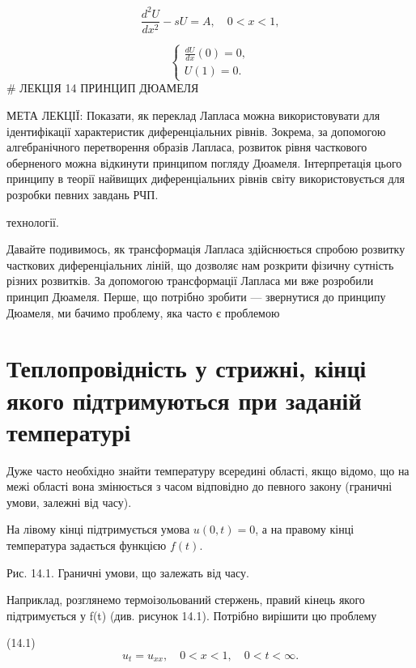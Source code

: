 \documentclass[
  ukrainian,
]{article}
\begin{document}
\[
\frac{d^2U}{dx^2} - sU = A, \quad 0 < x < 1,
\]

\[
\begin{cases}
\frac{dU}{dx}(0) = 0, \\
U(1) = 0.
\end{cases}
\] \# ЛЕКЦІЯ 14 ПРИНЦИП ДЮАМЕЛЯ

МЕТА ЛЕКЦІЇ: Показати, як переклад Лапласа можна використовувати для
ідентифікації характеристик диференціальних рівнів. Зокрема, за
допомогою алгебранічного перетворення образів Лапласа, розвиток рівня
часткового оберненого можна відкинути принципом погляду Дюамеля.
Інтерпретація цього принципу в теорії найвищих диференціальних рівнів
світу використовується для розробки певних завдань РЧП.

технології.

Давайте подивимось, як трансформація Лапласа здійснюється спробою
розвитку часткових диференціальних ліній, що дозволяє нам розкрити
фізичну сутність різних розвитків. За допомогою трансформації Лапласа ми
вже розробили принцип Дюамеля. Перше, що потрібно зробити --- звернутися
до принципу Дюамеля, ми бачимо проблему, яка часто є проблемою

\section{Теплопровідність у стрижні, кінці якого підтримуються при
заданій
температурі}\label{ux442ux435ux43fux43bux43eux43fux440ux43eux432ux456ux434ux43dux456ux441ux442ux44c-ux443-ux441ux442ux440ux438ux436ux43dux456-ux43aux456ux43dux446ux456-ux44fux43aux43eux433ux43e-ux43fux456ux434ux442ux440ux438ux43cux443ux44eux442ux44cux441ux44f-ux43fux440ux438-ux437ux430ux434ux430ux43dux456ux439-ux442ux435ux43cux43fux435ux440ux430ux442ux443ux440ux456}

Дуже часто необхідно знайти температуру всередині області, якщо відомо,
що на межі області вона змінюється з часом відповідно до певного закону
(граничні умови, залежні від часу).

На лівому кінці підтримується умова \(u(0,t)=0\), а на правому кінці
температура задається функцією \(f(t)\).

Рис. 14.1. Граничні умови, що залежать від часу.

Наприклад, розглянемо термоізольований стержень, правий кінець якого
підтримується у f(t) (див. рисунок 14.1). Потрібно вирішити цю проблему

(14.1) \[
u_t = u_{xx}, \quad 0 < x < 1, \quad 0 < t < \infty.
\]
\end{document}
